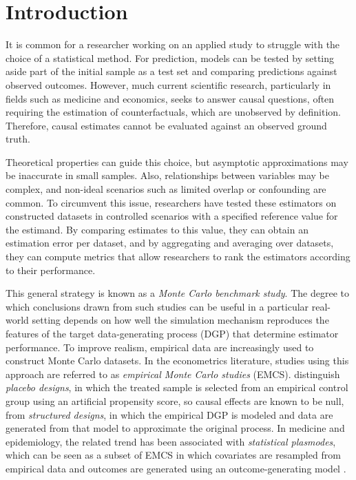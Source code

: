\section{Introduction}
\label{sec:introduction}
It is common for a researcher working on an applied study to struggle with the choice of a statistical method. For prediction, models can be tested by setting aside part of the initial sample as a test set and comparing predictions against observed outcomes. However, much current scientific research, particularly in fields such as medicine and economics, seeks to answer causal questions, often requiring the estimation of counterfactuals, which are unobserved by definition. Therefore, causal estimates cannot be evaluated against an observed ground truth.

Theoretical properties can guide this choice, but asymptotic approximations may be inaccurate in small samples. Also, relationships between variables may be complex, and non-ideal scenarios such as limited overlap or confounding are common. To circumvent this issue, researchers have tested these estimators on constructed datasets in controlled scenarios with a specified reference value for the estimand. By comparing estimates to this value, they can obtain an estimation error per dataset, and by aggregating and averaging over datasets, they can compute metrics that allow researchers to rank the estimators according to their performance.

This general strategy is known as a \emph{Monte Carlo benchmark study}. The degree to which conclusions drawn from such studies can be useful in a particular real-world setting depends on how well the simulation mechanism reproduces the features of the target data-generating process (DGP) that determine estimator performance. To improve realism, empirical data are increasingly used to construct Monte Carlo datasets. In the econometrics literature, studies using this approach are referred to as \emph{empirical Monte Carlo studies} (EMCS).  distinguish \emph{placebo designs}, in which the treated sample is selected from an empirical control group using an artificial propensity score, so causal effects are known to be null, from \emph{structured designs}, in which the empirical DGP is modeled and data are generated from that model to approximate the original process. In medicine and epidemiology, the related trend has been associated with \emph{statistical plasmodes}, which can be seen as a subset of EMCS in which covariates are resampled from empirical data and outcomes are generated using an outcome-generating model \cite{schreckStatisticalPlasmodeSimulations2024}.

